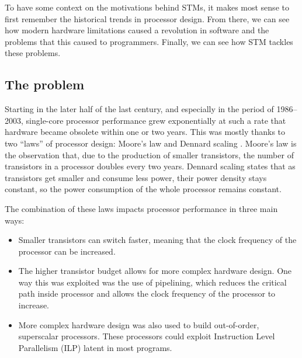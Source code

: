 \documentclass[12pt,a4paper,oneside,openright]{report}
\begin{document}
To have some context on the motivations behind STMs, it makes most
sense to first remember the historical trends in processor
design. From there, we can see how modern hardware limitations caused
a revolution in software and the problems that this caused to
programmers. Finally, we can see how STM tackles these problems.

\subsection{The problem}
\label{sec:problem}

Starting in the later half of the last century, and especially in the
period of 1986--2003, single-core processor performance grew
exponentially at such a rate that hardware became obsolete within one
or two years. This was mostly thanks to two ``laws'' of processor
design: Moore's law \cite{MooreLaw} and Dennard scaling
\cite{DennardScaling}. Moore's law is the observation that, due to the
production of smaller transistors, the number of transistors in a
processor doubles every two years\footnotemark. Dennard scaling states
that as transistors get smaller and consume less power, their power
density stays constant, so the power consumption of the whole
processor remains constant.


The combination of these laws impacts processor performance in three
main ways:

\begin{itemize}
\item Smaller transistors can switch faster, meaning that the clock
  frequency of the processor can be increased.
  
\item The higher transistor budget allows for more complex hardware
  design. One way this was exploited was the use of pipelining, which
  reduces the critical path inside processor and allows the clock
  frequency of the processor to increase.
  
\item More complex hardware design was also used to build
  out-of-order, superscalar processors. These processors could exploit
  Instruction Level Parallelism (ILP) \cite[Chapter~3]{CompArchBook}
  latent in most programs.
\end{itemize}
\end{document}
